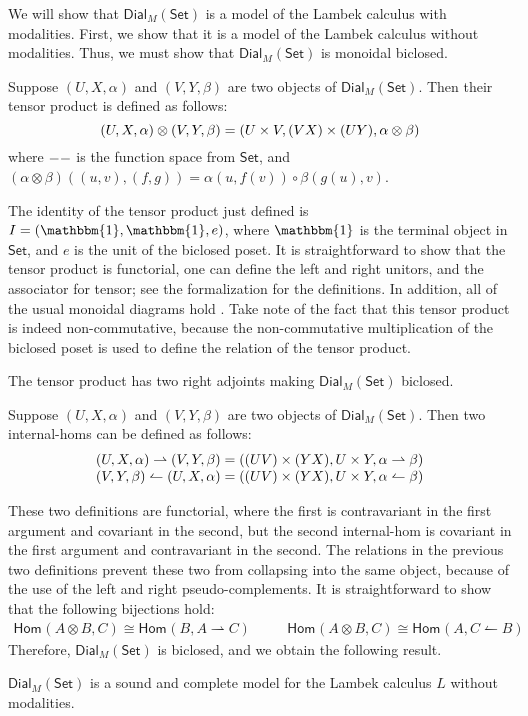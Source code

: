 \documentclass{lmcs}
\let\to\relax                   %
\newcommand{\to}{\rightarrow}
\newcommand{\rto}{\leftharpoonup}
\newcommand{\lto}{\rightharpoonup}
\newcommand{\Set}{\mathsf{Set}}
\newcommand{\Dial}[2]{\mathsf{Dial}_{#1}(#2)}
\newcommand{\Hom}[3]{\mathsf{Hom}_{#1}(#2,#3)}
\begin{document}
We will show that $\Dial{M}{\Set}$ is a model of the Lambek calculus with
modalities.  First, we show that it is a model of the Lambek calculus
without modalities.  Thus, we must show that $\Dial{M}{\Set}$ is
monoidal biclosed.

\begin{defi}
  \label{def:dial-monoidal-structure}
  Suppose $(U, X, \alpha)$ and $(V, Y, \beta)$ are two objects of
  $\Dial{M}{\Set}$. Then their tensor product is defined as follows:
  \[
  (U, X, \alpha) \otimes (V, Y, \beta) = (U \times V, (V \to X) \times (U \to Y), \alpha \otimes \beta)
  \]
  where $- \to -$ is the function space from $\Set$, and $(\alpha
  \otimes \beta)((u, v), (f, g)) = \alpha(u, f(v)) \circ \beta(g(u), v)$.
\end{defi}

\noindent
The identity of the tensor product just defined is $I = (\mathbbm{1},
\mathbbm{1}, e)$, where $\mathbbm{1}$ is the terminal object in
$\Set$, and $e$ is the unit of the biclosed poset.  It is
straightforward to show that the tensor product is functorial, one can
define the left and right unitors, and the associator for tensor; see
the formalization for the definitions.  In addition, all of the usual
monoidal diagrams hold \cite{depaiva1990}.  Take note of the fact that
this tensor product is indeed non-commutative, because the
non-commutative multiplication of the biclosed poset is used to define
the relation of the tensor product.

The tensor product has two right adjoints making $\Dial{M}{\Set}$
biclosed.
\begin{defi}
  \label{def:dial-is-biclosed}
  Suppose $(U, X, \alpha)$ and $(V, Y, \beta)$ are two objects of
  $\Dial{M}{\Set}$. Then two internal-homs can be defined as follows:
  \[
  \begin{array}{lll}
    (U, X, \alpha) \lto (V, Y, \beta) = ((U \to V) \times (Y \to X), U \times Y, \alpha \lto \beta)\\
    (V, Y, \beta) \rto (U, X, \alpha) = ((U \to V) \times (Y \to X), U \times Y, \alpha \rto \beta)\\
  \end{array}
  \]
\end{defi}
These two definitions are functorial, where the first is contravariant
in the first argument and covariant in the second, but the second
internal-hom is covariant in the first argument and contravariant in
the second.  The relations in the previous two definitions prevent
these two from collapsing into the same object, because of the use of
the left and right pseudo-complements. It is straightforward to show
that the following bijections hold:
\[
\begin{array}{lll}
  \Hom{}{A \otimes B}{C} \cong \Hom{}{B}{A \lto C} & \quad &  \Hom{}{A \otimes B}{C} \cong \Hom{}{A}{C \rto B}
\end{array}
\]
Therefore, $\Dial{M}{\Set}$ is biclosed, and we obtain the following
result.
\begin{thm}
  \label{thm:sound-lambek}
  $\Dial{M}{\Set}$ is a sound and complete model for the Lambek
  calculus $L$ without modalities.
\end{thm}
\vspace{-15px}
\end{document}
